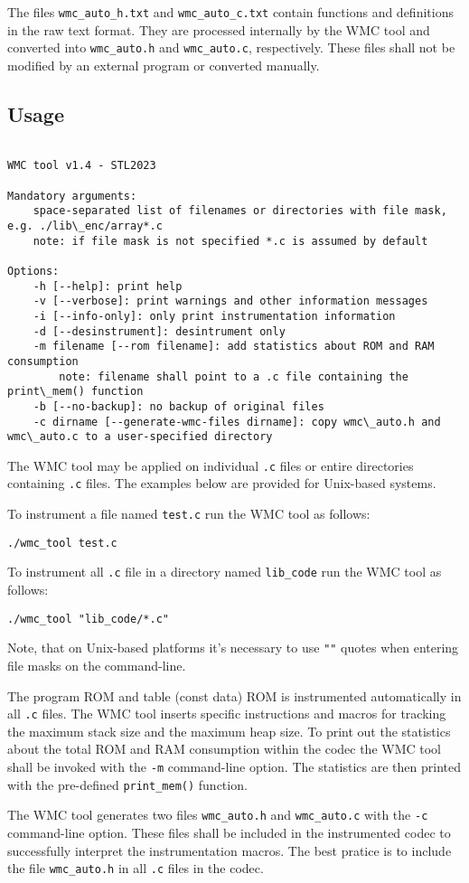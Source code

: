 The files {\tt wmc\_auto\_h.txt} and {\tt wmc\_auto\_c.txt} contain functions and definitions in the raw text format.
They are processed internally by the WMC tool and converted into {\tt wmc\_auto.h} and {\tt wmc\_auto.c}, respectively.
These files shall not be modified by an external program or converted manually.



\subsection{Usage}

\scriptsize
\begin{verbatim}

WMC tool v1.4 - STL2023

Mandatory arguments:
    space-separated list of filenames or directories with file mask, e.g. ./lib\_enc/array*.c
    note: if file mask is not specified *.c is assumed by default

Options:
    -h [--help]: print help
    -v [--verbose]: print warnings and other information messages
    -i [--info-only]: only print instrumentation information
    -d [--desinstrument]: desintrument only
    -m filename [--rom filename]: add statistics about ROM and RAM consumption
        note: filename shall point to a .c file containing the print\_mem() function
    -b [--no-backup]: no backup of original files
    -c dirname [--generate-wmc-files dirname]: copy wmc\_auto.h and wmc\_auto.c to a user-specified directory

\end{verbatim}
\normalsize

The WMC tool may be applied on individual {\tt .c} files or entire directories containing {\tt .c} files.
The examples below are provided for Unix-based systems.

To instrument a file named {\tt test.c} run the WMC tool as follows:

{\tt ./wmc\_tool test.c }

To instrument all {\tt .c} file in a directory named {\tt lib\_code} run the WMC tool as follows:

{\tt ./wmc\_tool "lib\_code/*.c" }

Note, that on Unix-based platforms it's necessary to use {\tt ""} quotes when entering file masks on the command-line.

The program ROM and table (const data) ROM is instrumented automatically in all {\tt .c} files.
The WMC tool inserts specific instructions and macros for tracking the maximum stack size and the maximum heap size.
To print out the statistics about the total ROM and RAM consumption within the codec the WMC tool shall be invoked with the {\tt -m} command-line option.
The statistics are then printed with the pre-defined {\tt print\_mem()} function.

The WMC tool generates two files {\tt wmc\_auto.h} and {\tt wmc\_auto.c} with the {\tt -c} command-line option.
These files shall be included in the instrumented codec to successfully interpret the instrumentation macros.
The best pratice is to include the file {\tt wmc\_auto.h} in all {\tt .c} files in the codec.



